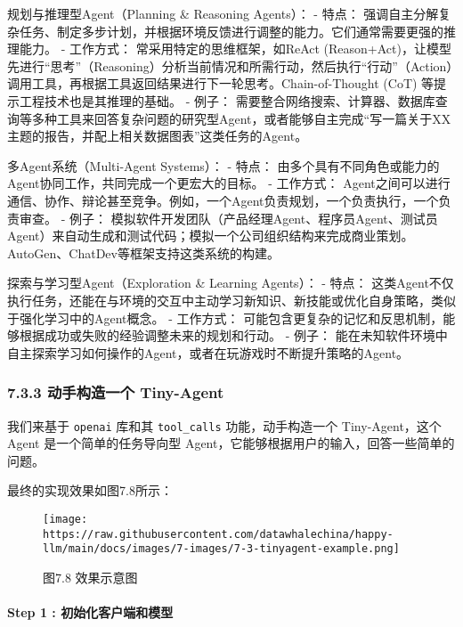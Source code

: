 \documentclass[12pt,a4paper]{book}
\begin{document}
规划与推理型Agent（Planning \& Reasoning Agents）： - 特点：
强调自主分解复杂任务、制定多步计划，并根据环境反馈进行调整的能力。它们通常需要更强的推理能力。
- 工作方式： 常采用特定的思维框架，如ReAct
(Reason+Act)，让模型先进行``思考''（Reasoning）分析当前情况和所需行动，然后执行``行动''（Action）调用工具，再根据工具返回结果进行下一轮思考。Chain-of-Thought
(CoT) 等提示工程技术也是其推理的基础。 - 例子：
需要整合网络搜索、计算器、数据库查询等多种工具来回答复杂问题的研究型Agent，或者能够自主完成``写一篇关于XX主题的报告，并配上相关数据图表''这类任务的Agent。

多Agent系统（Multi-Agent Systems）： - 特点：
由多个具有不同角色或能力的Agent协同工作，共同完成一个更宏大的目标。 -
工作方式：
Agent之间可以进行通信、协作、辩论甚至竞争。例如，一个Agent负责规划，一个负责执行，一个负责审查。
- 例子：
模拟软件开发团队（产品经理Agent、程序员Agent、测试员Agent）来自动生成和测试代码；模拟一个公司组织结构来完成商业策划。AutoGen、ChatDev等框架支持这类系统的构建。

探索与学习型Agent（Exploration \& Learning Agents）： - 特点：
这类Agent不仅执行任务，还能在与环境的交互中主动学习新知识、新技能或优化自身策略，类似于强化学习中的Agent概念。
- 工作方式：
可能包含更复杂的记忆和反思机制，能够根据成功或失败的经验调整未来的规划和行动。
- 例子：
能在未知软件环境中自主探索学习如何操作的Agent，或者在玩游戏时不断提升策略的Agent。

\subsubsection{7.3.3 动手构造一个
Tiny-Agent}\label{ux52a8ux624bux6784ux9020ux4e00ux4e2a-tiny-agent}

我们来基于 \texttt{openai} 库和其 \texttt{tool\_calls}
功能，动手构造一个 Tiny-Agent，这个 Agent 是一个简单的任务导向型
Agent，它能够根据用户的输入，回答一些简单的问题。

最终的实现效果如图7.8所示：

\begin{figure}[htbp]\centering
\texttt{[image: https://raw.githubusercontent.com/datawhalechina/happy-llm/main/docs/images/7-images/7-3-tinyagent-example.png]}
\caption{图7.8 效果示意图}
\end{figure}

\paragraph{Step 1 :
初始化客户端和模型}\label{step-1-ux521dux59cbux5316ux5ba2ux6237ux7aefux548cux6a21ux578b}
\end{document}
